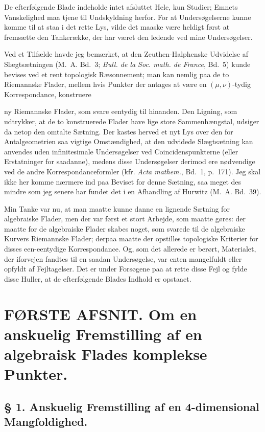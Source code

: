 \documentclass{article}
\begin{document}
De efterfølgende Blade indeholde intet afsluttet Hele, kun Studier; Emnets Vanskelighed maa tjene til Undskyldning herfor. For at Undersøgelserne kunne komme til at staa i det rette Lys, vilde det maaske være heldigt først at fremsætte den Tankerække, der har været den ledende ved mine Undersøgelser.

Ved et Tilfælde havde jeg bemærket, at den Zeuthen-Halphenske Udvidelse af Slægtsætningen (M.~A. Bd.~3; \emph{Bull. de la Soc. math. de France}, Bd.~5) kunde bevises ved et rent topologisk Ræsonnement; man kan nemlig paa de to Riemannske Flader, mellem hvis Punkter der antages at være en $(\mu, \nu)$-tydig Korrespondance, konstruere

ny Riemannske Flader, som svare eentydig til hinanden. Den Ligning, som udtrykker, at de to konstruerede Flader have lige store Sammenhængstal, udsiger da netop den omtalte Sætning. Der kastes herved et nyt Lys over den for Antalgeometrien saa vigtige Omstændighed, at den udvidede Slægtsætning kan anvendes uden infinitesimale Undersøgelser ved Coincidenspunkterne (eller Erstatninger for saadanne), medens disse Undersøgelser derimod ere nødvendige ved de andre Korrespondanceformler (kfr. \emph{Acta mathem.}, Bd.~1, p.~171). Jeg skal ikke her komme nærmere ind paa Beviset for denne Sætning, saa meget des mindre som jeg senere har fundet det i en Afhandling af Hurwitz (M.~A. Bd.~39).

Min Tanke var nu, at man maatte kunne danne en lignende Sætning for algebraiske Flader, men der var først et stort Arbejde, som maatte gøres: der maatte for de algebraiske Flader skabes noget, som svarede til de algebraiske Kurvers Riemannske Flader; derpaa maatte der opstilles topologiske Kriterier for disses een-eentydige Korrespondance. Og, som det allerede er berørt, Materialet, der iforvejen fandtes til en saadan Undersøgelse, var enten mangelfuldt eller opfyldt af Fejltagelser. Det er under Forsøgene paa at rette disse Fejl og fylde disse Huller, at de efterfølgende Blades Indhold er opstaaet.

\section*{FØRSTE AFSNIT. Om en anskuelig Fremstilling af en algebraisk Flades komplekse Punkter.}

\subsection*{§ 1. Anskuelig Fremstilling af en 4-dimensional Mangfoldighed.}
\end{document}
